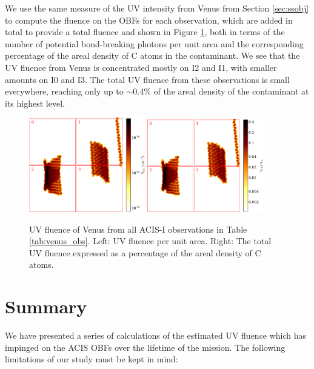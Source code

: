 \documentclass[11pt]{article}
\begin{document}
We use the same measure of the UV intensity from Venus from Section \ref{sec:ssobj} to compute the fluence on the OBFs for each observation, which are added in total to provide a total fluence and shown in Figure \ref{fig:total_venus_fluence}, both in terms of the number of potential bond-breaking photons per unit area and the corresponding percentage of the areal density of C atoms in the contaminant. We see that the UV fluence from Venus is concentrated mostly on I2 and I1, with smaller amounts on I0 and I3. The total UV fluence from these observations is small everywhere, reaching only up to $\sim$0.4\% of the areal density of the contaminant at its highest level.

\begin{figure}
\begin{center}
\includegraphics[width=0.45\textwidth]{venus_all_fluence.eps}
\includegraphics[width=0.45\textwidth]{venus_all_fluence_percent.eps}
\caption{UV fluence of Venus from all ACIS-I observations in Table \ref{tab:venus_obs}. Left: UV fluence per unit area. Right: The total UV fluence expressed as a percentage of the areal density of C atoms.\label{fig:total_venus_fluence}}
\end{center}
\end{figure}

\section{Summary}

We have presented a series of calculations of the estimated UV fluence which has impinged on the ACIS OBFs
over the lifetime of the mission. The following limitations of our study must be kept in mind:
\end{document}
